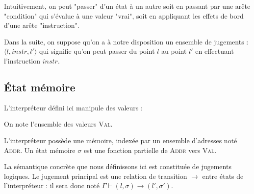 \begin{minipage}{0.5\textwidth}

\end{minipage}
\begin{minipage}{0.5\textwidth}

\end{minipage}



Intuitivement, on peut "passer" d'un état à un autre soit en passant par une
arête "condition" qui s'évalue à une valeur "vrai", soit en appliquant les
effets de bord d'une arête "instruction".

Dans la suite, on suppose qu'on a à notre disposition un ensemble de jugements :
$\langle l, instr, l' \rangle$ qui signifie qu'on peut passer du point $l$ au
point $l'$ en effectuant l'instruction $instr$.

\subsection{État mémoire}
\label{sec:sigma}

L'interpréteur défini ici manipule des valeurs :


On note l'ensemble des valeurs \textsc{Val}.

\begin{definition}
L'interpréteur possède une mémoire, indexée par un ensemble d'adresses noté
\textsc{Addr}. Un état mémoire $σ$ est une fonction partielle de \textsc{Addr}
vers \textsc{Val}.
\end{definition}



\begin{definition}
La sémantique concrète que nous définissons ici est constituée de jugements
logiques. Le jugement principal est une relation de transition $\rightarrow$
entre états de l'interpréteur : il sera donc noté $Γ ⊢ (l, σ) \rightarrow (l', σ')$.
\end{definition}

